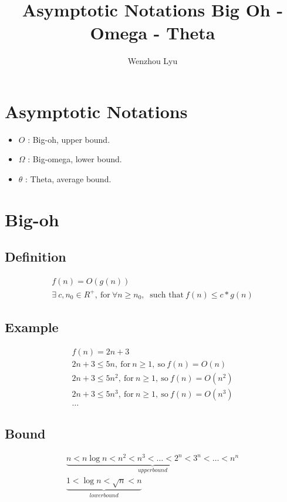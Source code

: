 \documentclass{article}
\title{Asymptotic Notations Big Oh - Omega - Theta}
\author{Wenzhou Lyu}
\begin{document}
\maketitle

\section{Asymptotic Notations}
\begin{itemize}
\item $O$ : Big-oh, upper bound.
\item $\Omega$ : Big-omega, lower bound.
\item $\theta$ : Theta, average bound.
\end{itemize}
\section{Big-oh}

\subsection{Definition}
\begin{gather*}
f(n)=O(g(n)) \\
\exists \ c,n_0\in R^+,\ \text{for} \ \forall n\geq n_0, \ \text{\ such that}\ f(n)\leq c*g(n)
\end{gather*}

\subsection{Example}
\begin{gather*}
    f(n) = 2n + 3 \\
    2n+3 \leq 5n, \ \text{for} \ n\geq 1,\ \text{so} \ f(n)=O(n) \\
    2n+3 \leq 5n^2, \ \text{for} \ n\geq 1,\ \text{so} \ f(n)=O(n^2) \\ 
    2n+3 \leq 5n^3, \ \text{for} \ n\geq 1,\ \text{so} \ f(n)=O(n^3) \\ 
    \ldots
\end{gather*}

\subsection{Bound}
\begin{gather*}
    \underbrace {n < n\log n<n^2<n^3<\ldots<2^n<3^n<\ldots<n^n}_{upper bound} \\ 
     \underbrace {1<\log n<\sqrt{n}<n}_{lower bound}
\end{gather*}
\end{document}
